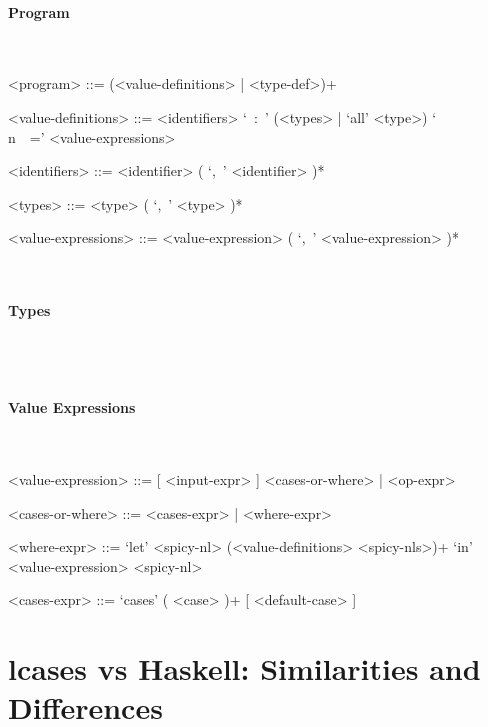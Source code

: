 \documentclass{article}
\begin{document}
\paragraph{Program}
\hspace{1cm}\\
\begin{grammar}

<program> ::= (<value-definitions> | <type-def>)+

<value-definitions> ::=
<identifiers> `\ :\ ' (<types> | `all' <type>) `\\n\ \ =' <value-expressions>

<identifiers> ::= <identifier> ( `,\ ' <identifier> )*  

<types> ::= <type> ( `,\ ' <type> )*  

<value-expressions> ::= <value-expression> ( `,\ ' <value-expression> )*  

\end{grammar}
\hspace{1cm}\\

\paragraph{Types}

\hspace{1cm}\\


\hspace{1cm}\\

\paragraph{Value Expressions}

\hspace{1cm}\\
\begin{grammar}

<value-expression> ::= [ <input-expr> ] <cases-or-where> | <op-expr>

<cases-or-where> ::= <cases-expr> | <where-expr>

<where-expr> ::=
`let' <spicy-nl> (<value-definitions> <spicy-nls>)+ `in' <value-expression> <spicy-nl>

<cases-expr> ::= `cases' ( <case> )+ [ <default-case> ]

\end{grammar}

\section{lcases vs Haskell: Similarities and Differences}
\end{document}
